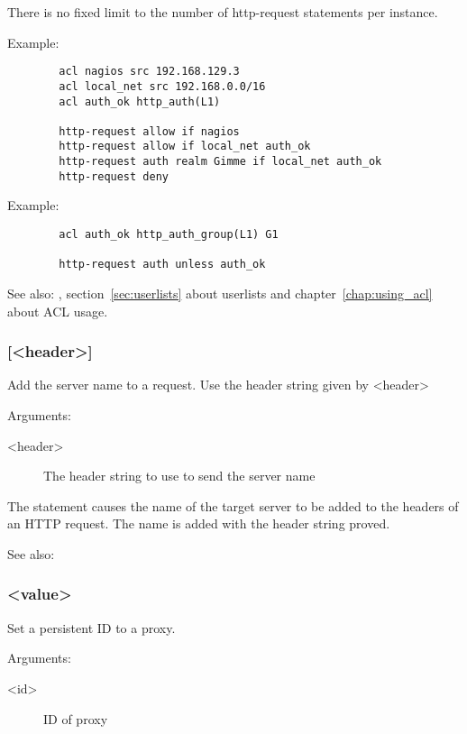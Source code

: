   There is no fixed limit to the number of http-request statements per
  instance.

  Example:
  \begin{verbatim}
        acl nagios src 192.168.129.3
        acl local_net src 192.168.0.0/16
        acl auth_ok http_auth(L1)

        http-request allow if nagios
        http-request allow if local_net auth_ok
        http-request auth realm Gimme if local_net auth_ok
        http-request deny
    \end{verbatim}

  Example:
\begin{verbatim}
        acl auth_ok http_auth_group(L1) G1

        http-request auth unless auth_ok
\end{verbatim}


See also: , section~\ref{sec:userlists} about userlists and chapter~\ref{chap:using_acl}
             about ACL usage.

\subsubsection[http-send-name-header]{ [<header>]}

  Add the server name to a request. Use the header string given by <header>


  Arguments:
  
\begin{description}
\item[ <header>]  The header string to use to send the server name
\end{description}

  The  statement causes the name of the target
  server to be added to the headers of an HTTP request.  The name
  is added with the header string proved.


See also: 

\subsubsection[id]{ <value>}

  Set a persistent ID to a proxy.
  
  
  Arguments:
\begin{description}
\item[<id>] ID of proxy 
\end{description}

